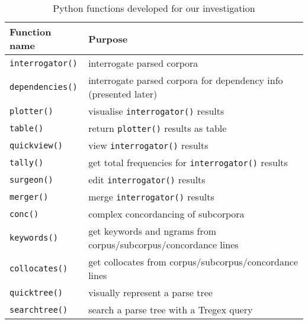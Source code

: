 \begin{table}[h!]
\small
\centering
\begin{tabularx}{0.5\textwidth}{|l|X|} \hline

\textbf{Function name} &  \textbf{Purpose}     \\ \hline
\texttt{interrogator()}  &  interrogate parsed corpora          \\ \hline
\texttt{dependencies()}  &  interrogate parsed corpora for dependency info (presented later)          \\ \hline
\texttt{plotter()}       &  visualise \texttt{interrogator()} results  \\ \hline
\texttt{table()}          &  return \texttt{plotter()} results as table  \\ \hline
\texttt{quickview()}     &  view \texttt{interrogator()} results       \\ \hline
\texttt{tally()}       &  get total frequencies for \texttt{interrogator()} results       \\ \hline
\texttt{surgeon()}       &  edit \texttt{interrogator()} results       \\ \hline
\texttt{merger()}       &  merge \texttt{interrogator()} results       \\ \hline
\texttt{conc()}          &  complex concordancing of subcorpora  \\ \hline
\texttt{keywords()}          &  get keywords and ngrams from corpus\slash subcorpus\slash concordance lines  \\ \hline
\texttt{collocates()}          &  get collocates from corpus\slash subcorpus\slash concordance lines \\ \hline
\texttt{quicktree()}          &  visually represent a parse tree  \\ \hline
\texttt{searchtree()}          &  search a parse tree with a Tregex query  \\ \hline
\end{tabularx}
\caption{Python functions developed for our investigation}
\label{tab:pyfunc}
\end{table}

